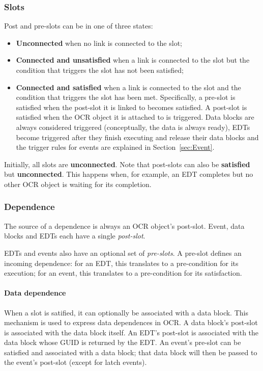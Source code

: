 \subsubsection{Slots}
Post and pre-slots can be in one of three states:
\begin{itemize}
\item {\bf Unconnected} when no link is connected to the slot;
\item {\bf Connected and unsatisfied} when a link is connected to the
  slot but the condition that triggers the slot has not been
  satisfied;
\item {\bf Connected and satisfied}
  when a link is connected to the
  slot and the condition that triggers the slot has been
  met. Specifically, a pre-slot is satisfied when the post-slot it is
  linked to becomes satisfied. A post-slot is satisfied when the
  OCR object it is attached to is triggered. Data
  blocks are always considered triggered (conceptually, the data is
  always ready), EDTs become triggered after they finish executing and
  release their data blocks and the trigger rules for events are
  explained in Section~\ref{sec:Event}.
\end{itemize}
Initially, all slots are {\bf unconnected}. Note that post-slots can also
be {\bf satisfied} but {\bf unconnected}. This happens when, for
example, an EDT completes but no other OCR object is waiting for its completion.

\subsubsection{Dependence}
The source of a dependence is always an OCR object's post-slot.
Event, data blocks and EDTs each have a
single \emph{post-slot}.

EDTs and events also have an optional set of
\emph{pre-slots}. A pre-slot defines an incoming
dependence: for an EDT, this translates to a pre-condition for its
execution; for an event, this translates to a pre-condition for its
satisfaction.
%
\paragraph{Data dependence}
When a slot is satified, it can optionally be associated with a data
block. This mechanism is used to express data dependences in OCR. A
data block's post-slot is associated with the data block itself. An
EDT's post-slot is associated with the data block whose GUID is
returned by the EDT. An event's pre-slot can be satisfied and
associated with a data block; that data block will then be passed to
the event's post-slot (except for latch events).

